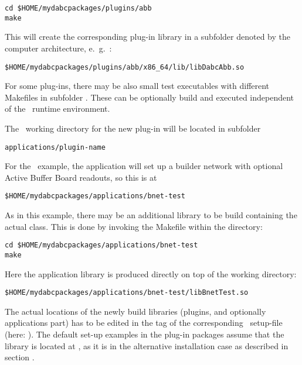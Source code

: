 \begin{verbatim}
cd $HOME/mydabcpackages/plugins/abb
make
\end{verbatim} 
This will create the corresponding plug-in library in a subfolder denoted by the
computer architecture, e.~g.~:
\begin{verbatim}
$HOME/mydabcpackages/plugins/abb/x86_64/lib/libDabcAbb.so
\end{verbatim} 


\item For some plug-ins, there may be also small test executables with different Makefiles in subfolder . These can be optionally build and executed independent of the
\dabc\ runtime environment.

\item The \dabc\ working directory for the new plug-in will be located in
subfolder 
\begin{verbatim}
applications/plugin-name 
\end{verbatim}
For the \ABB\ example, the application
will set up a builder network with optional Active Buffer Board readouts, so this
is at
\begin{verbatim}
$HOME/mydabcpackages/applications/bnet-test
\end{verbatim}
As in this example, there may be an additional library to be build containing the actual
 class. This is done by invoking the Makefile within the directory:
\begin{verbatim}
cd $HOME/mydabcpackages/applications/bnet-test
make
\end{verbatim}
Here the application library is produced directly on top of the working directory: 
\begin{verbatim}
$HOME/mydabcpackages/applications/bnet-test/libBnetTest.so
\end{verbatim}

\item The actual locations of the newly build libraries (plugins, and optionally applications part) has to be edited in the 
 tag of the corresponding \dabc\ setup-file (here: ).
The default set-up examples in the plug-in packages assume that the library is located
at , as it is in the alternative installation case as described in
section .

\enum


